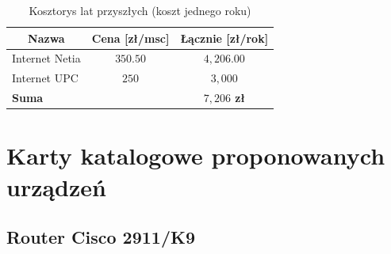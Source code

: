 \documentclass[a4paper,12pt]{extarticle}  %
\begin{document}
\begin{table}[H]
	\centering
	\caption{Kosztorys lat przyszłych (koszt jednego roku)}
	\begin{tabular}{|lc|c|}
		\hline
		\multicolumn{1}{|c|}{\textbf{Nazwa}} & \textbf{Cena [zł/msc]} & \textbf{Łącznie [zł/rok]} \\ \hline
		\multicolumn{1}{|l|}{Internet Netia} & $350.50$               & $4,206.00$                \\ \hline
		\multicolumn{1}{|l|}{Internet UPC}   & $250$                  & $3,000$                   \\ \hline
		\textbf{Suma}                        & \multicolumn{1}{l|}{}  & \textbf{$7,206$ zł}       \\ \hline
	\end{tabular}
\end{table}

\section{Karty katalogowe proponowanych urządzeń}
\subsection{Router Cisco 2911/K9}
\begin{figure}[H]
	\centering
\end{figure}
\end{document}
